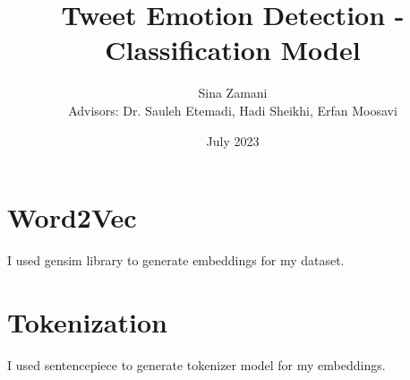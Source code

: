 \documentclass[rnd]{extarticle}
\begin{document}
  

	\title{Tweet Emotion Detection - Classification Model}

	\author{Sina Zamani\\[0.2cm]{\small Advisors: Dr. Sauleh Etemadi, Hadi Sheikhi, Erfan Moosavi}}

	\date{July 2023}
	
	\maketitle

	\pagestyle{plain}
	
	
	\section{Word2Vec}
		I used gensim library to generate embeddings for my dataset.
		
	\section{Tokenization}
		I used sentencepiece to generate tokenizer model for my embeddings.
		
	
	
	
\end{document}
